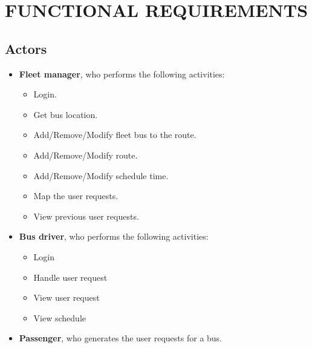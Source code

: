 \section{FUNCTIONAL REQUIREMENTS}
\subsection{Actors}
\begin{itemize}
	\item \textbf{Fleet manager}, who performs the following activities:
	\begin{itemize}
		\item Login.
		\item Get bus location.
		\item Add/Remove/Modify fleet bus to the route.
		\item Add/Remove/Modify route.
		\item Add/Remove/Modify schedule time.
		\item Map the user requests.
		\item View previous user requests.
	\end{itemize}
\item \textbf{Bus driver}, who performs the following activities:
\begin{itemize}
	\item Login
	\item Handle user request
	\item View user request
	\item View schedule	
\end{itemize}
\item \textbf{Passenger}, who generates the user requests for a bus.
\end{itemize}
\newpage
